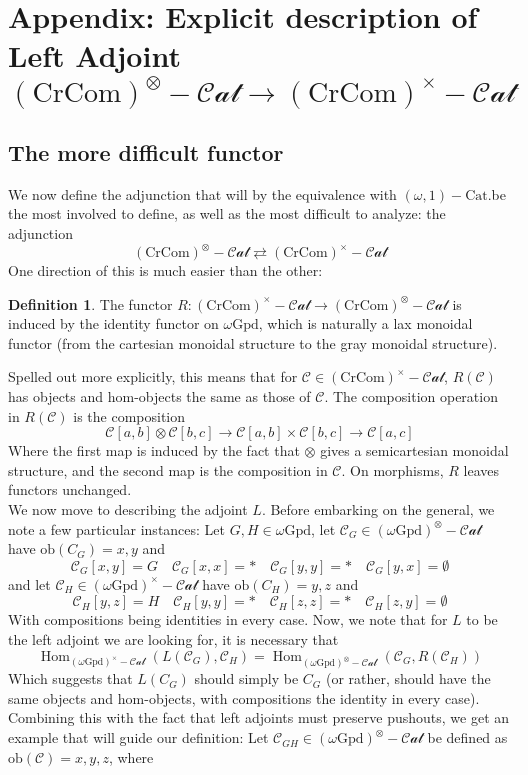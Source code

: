 \documentclass[12pt]{article}
\theoremstyle{definition}
\newtheorem{definition}[theorem]{Definition}
\newcommand{\C}{\mathcal{C}}
\newcommand{\stinfty}{\omega\text{Gpd}}
\newcommand{\crcom}{\text{CrCom}}
\newcommand{\graycatzero}{(\stinfty)^\otimes-\mathcal{Cat}}
\newcommand{\cartesiancatzero}{(\stinfty)^\times-\mathcal{Cat}}
\newcommand{\cartcrossedcat}{(\crcom)^\times-\mathcal{Cat}}
\newcommand{\tensorcrossedcat}{(\crcom)^\otimes-\mathcal{Cat}}
\newcommand{\ob}{\text{ob}}
\newcommand{\forgetcartesian}{R}
\newcommand{\forcecartesian}{L}
\DeclareMathOperator{\Hom}{Hom}
\begin{document}
\section{Appendix: Explicit description of Left Adjoint $\tensorcrossedcat \to \cartcrossedcat$}
	\subsection{The more difficult functor}
		We now define the adjunction that will by the equivalence with $(\omega,1)-\text{Cat}$.be the most involved to define, as well as the most difficult to analyze: the adjunction 
		$$\tensorcrossedcat \rightleftarrows \cartcrossedcat$$
		One direction of this is much easier than the other: 
		\begin{definition}
			The functor $\forgetcartesian : \cartcrossedcat \to \tensorcrossedcat$ is induced by the identity functor on $\stinfty$, which is naturally a lax monoidal functor (from the cartesian monoidal structure to the gray monoidal structure). 
		\end{definition}
		Spelled out more explicitly, this means that for $\C \in \cartcrossedcat$, $\forgetcartesian(\C)$ has objects and hom-objects the same as those of $\C$. The composition operation in $\forgetcartesian(\C)$ is the composition
		$$\C[a,b] \otimes \C[b,c] \to \C[a,b] \times \C[b,c] \to \C[a,c]$$
		Where the first map is induced by the fact that $\otimes$ gives a semicartesian monoidal structure, and the second map is the composition in $\C$. On morphisms, $\forgetcartesian$ leaves functors unchanged.
		\\
		\indent We now move to describing the adjoint $\forcecartesian$. 
		Before embarking on the general, we note a few particular instances: 
		Let $G,H \in \stinfty$, let $\C_G \in \graycatzero$ have $\ob(C_G) = {x,y}$ and 
		$$\C_G[x,y] = G \quad \C_G[x,x] = * \quad \C_G[y,y] = * \quad \C_G[y,x] = \emptyset$$
		and let $\C_H \in \cartesiancatzero$ have $\ob(C_H) = {y,z}$ and 
		$$\C_H[y,z] = H \quad \C_H[y,y] = * \quad \C_H[z,z] = * \quad \C_H[z,y] = \emptyset$$
		With compositions being identities in every case.
		Now, we note that for $\forcecartesian$ to be the left adjoint we are looking for, it is necessary that
		$$\Hom_{\cartesiancatzero}(\forcecartesian(\C_G), \C_H) = \Hom_{\graycatzero}(\C_G, \forgetcartesian(\C_H)) $$
		Which suggests that $\forcecartesian(C_G)$ should simply be $C_G$ (or rather, should have the same objects and hom-objects, with compositions the identity in every case). Combining this with the fact that left adjoints must preserve pushouts, we get an example that will guide our definition: Let $\C_{GH} \in \graycatzero$ be defined as $\ob(\C) = {x,y,z}$, where
\end{document}
